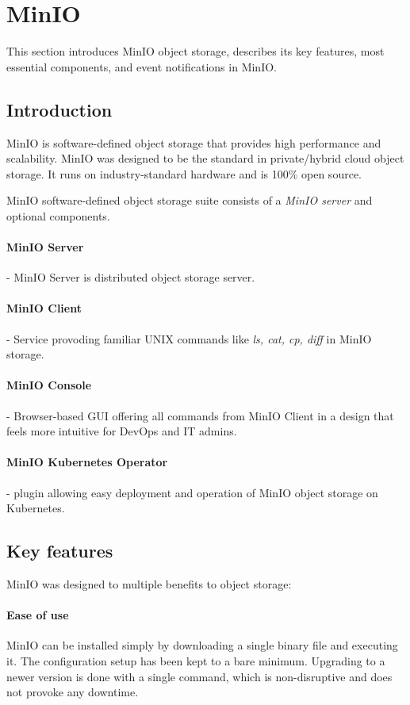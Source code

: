 \newpage
\section{MinIO}\label{chap:minio}
This section introduces MinIO object storage, describes its key features, most essential components, and event notifications in MinIO.

    \subsection{Introduction}
    MinIO is software-defined object storage that provides high performance and scalability. MinIO was designed to be the standard in private/hybrid cloud object storage.
    It runs on industry-standard hardware and is 100\% open source\cite{minioObjectStorage}.

    MinIO software-defined object storage suite consists of a \textit{MinIO server} and optional components.

    \paragraph{MinIO Server} - MinIO Server is distributed object storage server.
    \paragraph{MinIO Client} - Service provoding familiar UNIX commands like \textit{ls, cat, cp, diff} in MinIO storage.
    \paragraph{MinIO Console} - Browser-based GUI offering all commands from MinIO Client in a design that feels more intuitive for DevOps and IT admins.
    \paragraph{MinIO Kubernetes Operator} - plugin allowing easy deployment and operation of MinIO object storage on Kubernetes.

    \subsection{Key features}
    MinIO was designed to multiple benefits to object storage:

    \paragraph{Ease of use}
    MinIO can be installed simply by downloading a single binary file and executing it. The configuration setup has been kept to a bare minimum. Upgrading to a newer version is done with a single command, which is non-disruptive and does not provoke any downtime\cite{minioIntel}.

